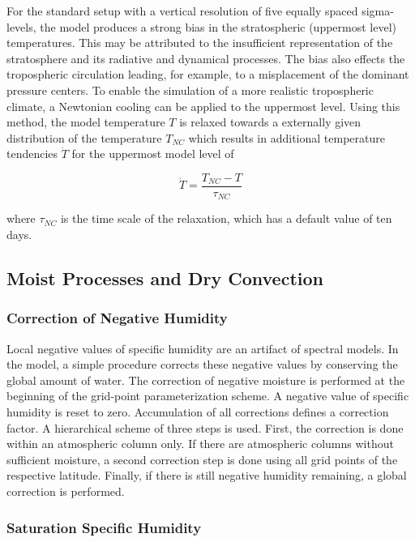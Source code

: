 For the standard setup with a vertical resolution of five equally spaced sigma-levels, the model
produces a strong bias in the stratospheric (uppermost level) temperatures. This may be
attributed to the insufficient representation of the stratosphere and its radiative and dynamical
processes. The bias also effects the tropospheric circulation leading, for example, to a
misplacement of the dominant pressure centers. To enable the simulation of a more realistic
tropospheric climate, a Newtonian cooling can be applied to the uppermost level. Using this
method, the model temperature $T$ is relaxed towards a externally given distribution of  the
temperature $T_{NC}$ which results in additional temperature tendencies $\dot{T}$ for the
uppermost model level of

\begin{equation}
\dot{T}=\frac{T_{NC}-T}{\tau_{NC}}
\end{equation}

where $\tau_{NC}$ is the time scale of the relaxation, which has a default value of ten days.

\newpage

\subsection{Moist Processes and Dry Convection}

\subsubsection{Correction of Negative Humidity}

Local negative values of specific humidity are an
artifact of spectral models. In the model, a simple
procedure corrects these negative values by
conserving the global amount of water. The correction of negative moisture is performed at the
beginning of the grid-point
parameterization scheme. A negative
value of specific humidity is reset to zero. 
Accumulation of all corrections defines a correction
factor. A hierarchical scheme of three steps is used. First, the correction is done within an
atmospheric column only. If there are atmospheric columns without sufficient moisture, a
second correction step is done using all grid points of the respective latitude. Finally, if there is
still negative humidity remaining, a global correction is performed.

\subsubsection{Saturation Specific Humidity}

